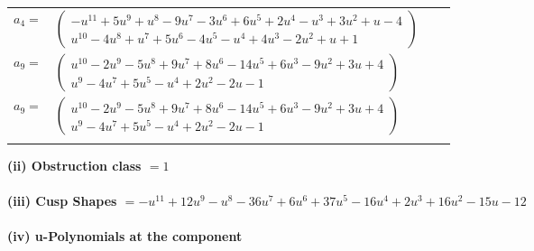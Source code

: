 \documentclass[1p]{elsarticle_modified}
\theoremstyle{definition}
\begin{document}
\begin{tabular}{m{7pt} m{180pt} m{7pt} m{180pt} }
\flushright $a_{4}=$&$\begin{pmatrix}- u^{11}+5 u^9+u^8-9 u^7-3 u^6+6 u^5+2 u^4- u^3+3 u^2+u-4\\u^{10}-4 u^8+u^7+5 u^6-4 u^5- u^4+4 u^3-2 u^2+u+1\end{pmatrix}$ \\
\flushright $a_{9}=$&$\begin{pmatrix}u^{10}-2 u^9-5 u^8+9 u^7+8 u^6-14 u^5+6 u^3-9 u^2+3 u+4\\u^9-4 u^7+5 u^5- u^4+2 u^2-2 u-1\end{pmatrix}$\\ \flushright $a_{9}=$&$\begin{pmatrix}u^{10}-2 u^9-5 u^8+9 u^7+8 u^6-14 u^5+6 u^3-9 u^2+3 u+4\\u^9-4 u^7+5 u^5- u^4+2 u^2-2 u-1\end{pmatrix}$\\&\end{tabular}
\flushleft \textbf{(ii) Obstruction class $= 1$}\\~\\
\flushleft \textbf{(iii) Cusp Shapes $= - u^{11}+12 u^9- u^8-36 u^7+6 u^6+37 u^5-16 u^4+2 u^3+16 u^2-15 u-12$}\\~\\
\newpage\renewcommand{\arraystretch}{1}
\flushleft \textbf{(iv) u-Polynomials at the component}\newline \\
\end{document}
